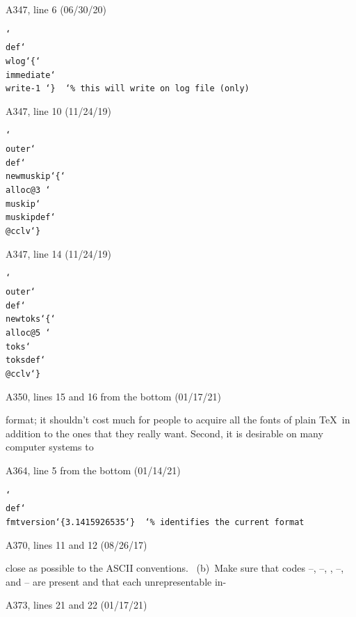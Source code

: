 \bugonpage A347, line 6 (06/30/20)

\ninepoint\noindent
\tt \char`\\def\char`\\wlog\char`\{\char`\\immediate\char`\\write-1 \char`\}
\ \char`\%\ this will write on log file (only)

\bugonpage A347, line 10 (11/24/19)

\ninepoint\noindent
\tt \char`\\outer\char`\\def\char`\\newmuskip\char`\{\char`\\alloc@3%
\char`\\muskip\char`\\muskipdef\char`\\@cclv\char`\}

\bugonpage A347, line 14 (11/24/19)

\ninepoint\noindent
\tt \char`\\outer\char`\\def\char`\\newtoks\char`\{\char`\\alloc@5%
\char`\\toks\char`\\toksdef\char`\\@cclv\char`\}

\bugonpage A350, lines 15 and 16 from the bottom (01/17/21)

\ninepoint\noindent
format; it shouldn't cost much for people to acquire all the
fonts of plain \TeX\ in addition to the ones that they really want. Second, it
is desirable on many computer systems to\cutpar

\bugonpage A364, line 5 from the bottom (01/14/21)

\ninepoint\noindent
\tt \char`\\def\char`\\fmtversion\char`\{3.1415926535\char`\}
\ \char`\%\ identifies the current format

\bugonpage A370, lines 11 and 12 (08/26/17)

\ninepoint\noindent
close as possible to the ASCII conventions.
\ (b)~Make sure that codes --, --,
, --, and -- are present and that
each unrepresentable in-\cutpar

\bugonpage A373, lines 21 and 22 (01/17/21)


